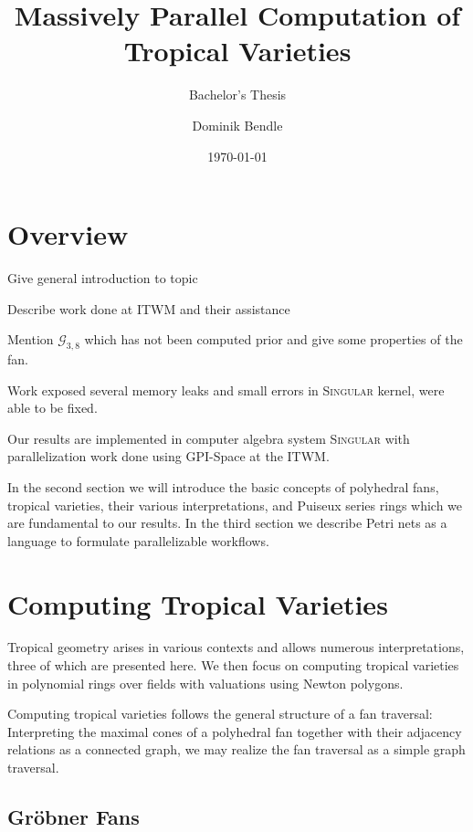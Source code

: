 \documentclass[
  paper=a4,
  DIV=14,
  fontsize=12pt,
  titlepage,
  bibliography=totoc,
  pagesize=pdftex
]{scrartcl}
\title{Massively Parallel Computation of Tropical Varieties}
\subtitle{Bachelor's Thesis}
\author{Dominik Bendle}
\date{\today}
\numberwithin{figure}{section}
\numberwithin{equation}{section}
\numberwithin{table}{section}
\theoremstyle{definition}
\numberwithin{definition}{section}
\begin{document}
\pagestyle{headings}

\maketitle

\tableofcontents
\newpage

\section{Overview}

Give general introduction to topic

Describe work done at ITWM and their assistance

Mention $\mathcal G_{3,8}$ which has not been computed prior and give some properties of the
fan.

Work exposed several memory leaks and small errors in \textsc{Singular} kernel, were able
to be fixed.

Our results are implemented in computer algebra system \textsc{Singular} \cite{Singular}
with parallelization work done using GPI-Space at the ITWM.


In the second section we will introduce the basic concepts of polyhedral fans, tropical
varieties, their various interpretations, and Puiseux series rings which we are
fundamental to our results. In the third section we describe Petri nets as a language to
formulate parallelizable workflows.


\section{Computing Tropical Varieties}

Tropical geometry arises in various contexts and allows numerous interpretations, three of
which are presented here. We then focus on computing tropical varieties in polynomial
rings over fields with valuations using Newton polygons.

Computing tropical varieties follows the general structure of a fan traversal:
Interpreting the maximal cones of a polyhedral fan together with their adjacency relations
as a connected graph, we may realize the fan traversal as a simple graph traversal.

\subsection{Gröbner Fans}
\end{document}
